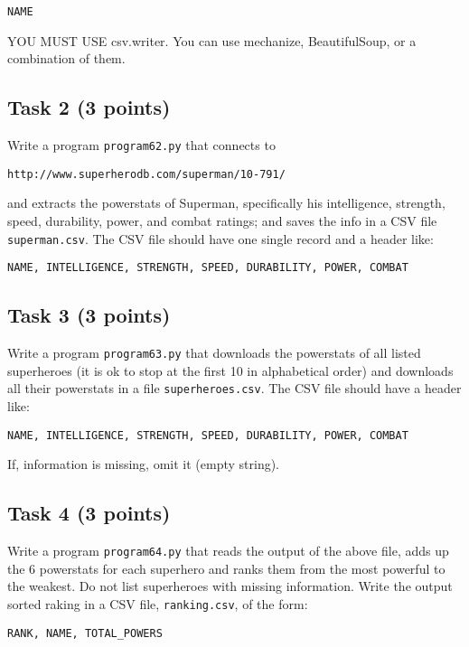 \documentclass[12pt]{article}
\begin{document}
\begin{verbatim}
NAME
\end{verbatim}

\noindent YOU MUST USE csv.writer. You can use mechanize, BeautifulSoup, or a combination of them.

\subsection{Task 2 (3 points)}

\noindent Write a program {\tt program62.py} that connects to 

\begin{verbatim}
http://www.superherodb.com/superman/10-791/
\end{verbatim}

and extracts the powerstats of Superman, specifically his intelligence, strength, speed, durability, power, and combat ratings; and saves the info in a CSV file {\tt superman.csv}. The CSV file should have one single record and a header like:

\begin{verbatim}
NAME, INTELLIGENCE, STRENGTH, SPEED, DURABILITY, POWER, COMBAT
\end{verbatim}

\subsection{Task 3 (3 points)}

\noindent Write a program {\tt program63.py} that downloads the powerstats of all listed superheroes (it is ok to stop at the first 10 in alphabetical order) and downloads all their powerstats in a file {\tt superheroes.csv}.  The CSV file should have a header like:

\begin{verbatim}
NAME, INTELLIGENCE, STRENGTH, SPEED, DURABILITY, POWER, COMBAT
\end{verbatim}

If, information is missing, omit it (empty string).

\subsection{Task 4 (3 points)}

Write a program {\tt program64.py} that reads the output of the above file, adds up the 6 powerstats for each superhero and ranks them from the most powerful to the weakest. Do not list superheroes with missing information. Write the output sorted raking in a CSV file, {\tt ranking.csv}, of the form:

\begin{verbatim}
RANK, NAME, TOTAL_POWERS
\end{verbatim}
\end{document}
